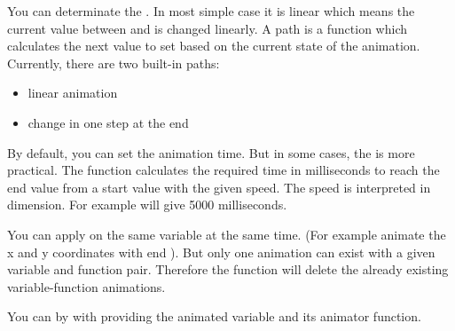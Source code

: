 \documentclass[letterpaper,10pt,english]{sphinxmanual}
\begin{document}
You can determinate the . In most simple case it is linear which means the current value between  and   is changed linearly. A path is a function which calculates the next value to set based on the current state of the animation. Currently, there are two built-in paths:
\begin{itemize}
\item {} 
 linear animation

\item {} 
 change in one step at the end

\end{itemize}

By default, you can set the animation time. But in some cases, the  is more practical. The  function calculates the required time in milliseconds to reach the end value from a start value with the given speed. The speed is interpreted in  dimension. For example  will give 5000 milliseconds.

You can apply  on the same variable at the same time. (For example animate the x and y coordinates with  end ). But only one animation can exist with a given variable and function pair. Therefore the  function will delete the already existing variable-function animations.

You can  by  with providing the animated variable and its animator function.



\renewcommand{\indexname}{Index}
\printindex
\end{document}
